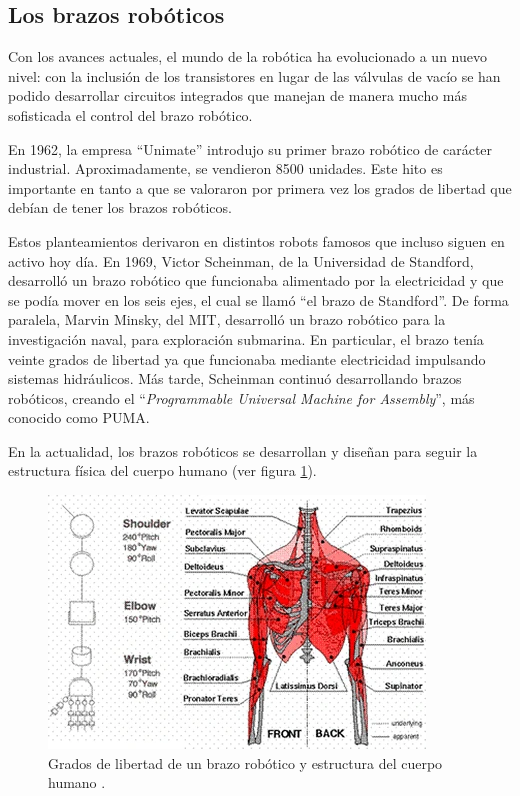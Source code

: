 \subsection{Los brazos robóticos}

Con los avances actuales, el mundo de la robótica ha evolucionado a un nuevo nivel: con la inclusión
de los transistores en lugar de las válvulas de vacío se han podido desarrollar circuitos integrados
que manejan de manera mucho más sofisticada el control del brazo robótico.

En 1962, la empresa ``Unimate'' introdujo su primer brazo robótico de carácter industrial. Aproximadamente,
se vendieron 8500 unidades. Este hito es importante en tanto a que se valoraron por primera vez los
grados de libertad que debían de tener los brazos robóticos. 

Estos planteamientos derivaron en distintos robots famosos que incluso siguen en activo hoy día. En
1969, Victor Scheinman, de la Universidad de Standford, desarrolló un brazo robótico que funcionaba
alimentado por la electricidad y que se podía mover en los seis ejes, el cual se llamó ``el brazo de
Standford''. De forma paralela, Marvin Minsky, del MIT, desarrolló un brazo robótico para la investigación
naval, para exploración submarina. En particular, el brazo tenía veinte grados de libertad ya que
funcionaba mediante electricidad impulsando sistemas hidráulicos. Más tarde, Scheinman continuó
desarrollando brazos robóticos, creando el ``\textit{Programmable Universal Machine for Assembly}'',
más conocido como PUMA.

En la actualidad, los brazos robóticos se desarrollan y diseñan para seguir la estructura física
del cuerpo humano (ver figura \ref{fig:human_body}).

\begin{figure}[H]
    \centering
    \includegraphics[width=.65\linewidth]{pictures/human_body.png}
    \caption{Grados de libertad de un brazo robótico y estructura del cuerpo humano \cite{moranEvolutionRoboticArms2007a}.}
    \label{fig:human_body}
\end{figure}

